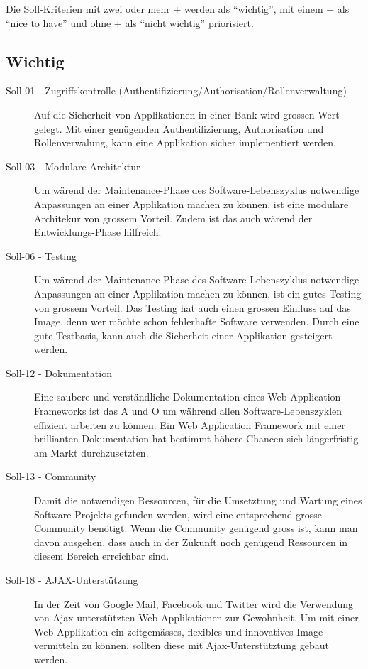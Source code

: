   Die Soll-Kriterien mit zwei oder mehr + werden als ``wichtig'', mit einem
  + als ``nice to have'' und ohne + als ``nicht wichtig'' priorisiert.
  
  \subsection{Wichtig}
  
  \begin{description}
  \item[Soll-01 - Zugriffskontrolle 
  (Authentifizierung/Authorisation/Rollenverwaltung)]
  Auf die Sicherheit von Applikationen in einer Bank wird grossen Wert
  gelegt. Mit einer genügenden Authentifizierung, Authorisation und
  Rollenverwalung, kann eine Applikation sicher implementiert werden.
  
  \item[Soll-03 - Modulare Architektur]
  Um wärend der Maintenance-Phase des Software-Lebenszyklus notwendige
  Anpassungen an einer Applikation machen zu können, ist eine modulare
  Architekur von grossem Vorteil. Zudem ist das auch wärend der
  Entwicklungs-Phase hilfreich.
  
  \item[Soll-06 - Testing]
  Um wärend der Maintenance-Phase des Software-Lebenszyklus notwendige
  Anpassungen an einer Applikation machen zu können, ist ein gutes Testing von
  grossem Vorteil. Das Testing hat auch einen grossen Einfluss auf das Image,
  denn wer möchte schon fehlerhafte Software verwenden. Durch eine gute
  Testbasis, kann auch die Sicherheit einer Applikation gesteigert werden.
  
  \item[Soll-12 - Dokumentation]
  Eine saubere und verständliche Dokumentation eines Web Application Frameworks
  ist das A und O um während allen Software-Lebenszyklen effizient arbeiten zu
  können. Ein Web Application Framework mit einer brillianten Dokumentation hat
  bestimmt höhere Chancen sich längerfristig am Markt durchzusetzten.
  
  \item[Soll-13 - Community]
  Damit die notwendigen Ressourcen, für die Umsetztung und Wartung eines
  Software-Projekts gefunden werden, wird eine entsprechend grosse Community
  benötigt. Wenn die Community genügend gross ist, kann man davon ausgehen,
  dass auch in der Zukunft noch genügend Ressourcen in diesem Bereich
  erreichbar sind.
  
  \item[Soll-18 - AJAX-Unterstützung]
  In der Zeit von Google Mail, Facebook und Twitter wird die Verwendung von
  \ac{Ajax} unterstützten Web Applikationen zur Gewohnheit. Um mit einer Web
  Applikation ein zeitgemässes, flexibles und innovatives Image vermitteln zu
  können, sollten diese mit Ajax-Unterstütztung gebaut werden.
  
  \end{description}
  
